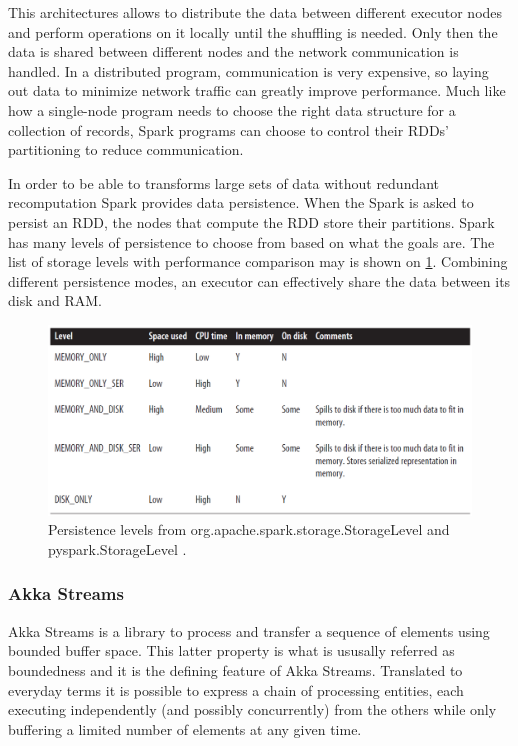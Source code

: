 This architectures allows to distribute the data between different executor nodes and perform operations on it locally until the shuffling is needed. Only then the data is shared between different nodes and the network communication is handled. In a distributed program, communication is very expensive, so laying out data to minimize network traffic can greatly improve performance. Much like how a single-node program needs to choose the right data structure for a collection of records, Spark programs can choose to control their RDDs’ partitioning to reduce communication.

In order to be able to transforms large sets of data without redundant recomputation Spark provides data persistence. When the Spark is asked to persist an RDD, the nodes that compute the RDD store their partitions. Spark has many levels of persistence to choose from based on what the goals are. The list of storage levels with performance comparison may is shown on \ref{img:spark_persistence_levels}. Combining different persistence modes, an executor can effectively share the data between its disk and RAM.

\begin{figure}
\centering \includegraphics[width=.6\textwidth]{img/spark_persistence_levels}
\caption{ Persistence levels from org.apache.spark.storage.StorageLevel and
pyspark.StorageLevel \cite{learning_spark}.}\label{img:spark_persistence_levels}
\end{figure}



\subsubsection{Akka Streams}


Akka Streams is a library to process and transfer a sequence of elements using bounded buffer space. This latter property is what is ususally referred as boundedness and it is the defining feature of Akka Streams. Translated to everyday terms it is possible to express a chain of processing entities, each executing independently (and possibly concurrently) from the others while only buffering a limited number of elements at any given time. 

